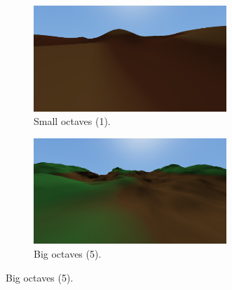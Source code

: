 \newpage
\begin{figure}[h]
    \centering
    \begin{subfigure}{0.45\textwidth}
        \centering
        \includegraphics[width=0.8\textwidth]{chapters/system_architecture/sections/terrain/resources/octaves-1.png}
        \caption{Small octaves (1).}
    \end{subfigure}
    \hfill
    \begin{subfigure}{0.45\textwidth}
        \centering
        \includegraphics[width=0.8\textwidth]{chapters/system_architecture/sections/terrain/resources/octaves-5.png}
        \caption{Big octaves (5).}
    \end{subfigure}


\end{figure}
